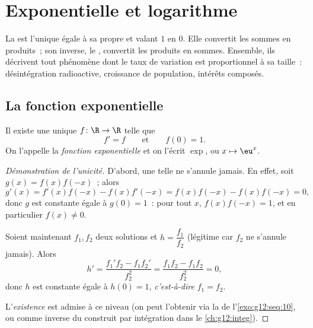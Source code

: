 \chapter{Exponentielle et logarithme}\label{ch:g12:exp}

La  est l'unique  égale à sa propre 
et valant $1$ en $0$. Elle convertit les sommes en produits~; son inverse,
le , convertit les produits en sommes. Ensemble, ils
décrivent tout phénomène dont le taux de variation est proportionnel à sa
taille~: désintégration radioactive, croissance de population, intérêts
composés.

\section{La fonction exponentielle}

\begin{theorem}\label{thm:g12:exp:existence}
Il existe une unique   $f \colon \R \to \R$ telle que
\[
f' = f \qquad\text{et}\qquad f(0) = 1 .
\]
On l'appelle la \emph{fonction exponentielle} et on
l'écrit $\exp$, ou $x \mapsto \eu^x$.
\end{theorem}

\begin{proof}[Démonstration de l'unicité]
D'abord, une telle  ne s'annule jamais. En effet, soit
$g(x) = f(x)f(-x)$~; alors
\[
g'(x) = f'(x)f(-x) - f(x)f'(-x) = f(x)f(-x) - f(x)f(-x) = 0,
\]
donc $g$ est constante égale à $g(0) = 1$~: pour tout $x$,
$f(x)f(-x) = 1$, et en particulier $f(x) \neq 0$.

Soient maintenant $f_1, f_2$ deux solutions et $h = \dfrac{f_1}{f_2}$
(légitime car $f_2$ ne s'annule jamais). Alors
\[
h' = \frac{f_1' f_2 - f_1 f_2'}{f_2^2} = \frac{f_1 f_2 - f_1 f_2}{f_2^2} = 0,
\]
donc $h$ est constante égale à $h(0) = 1$, \emph{c'est-à-dire}
$f_1 = f_2$.

L'\emph{existence} est admise à ce niveau (on peut l'obtenir via la 
de l'\cref{exo:g12:seq:10}, ou comme inverse du  construit par
intégration dans le \cref{ch:g12:integ}).
\end{proof}

